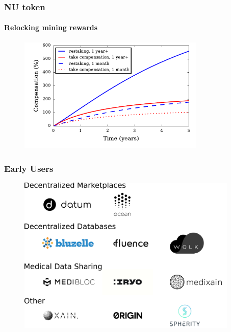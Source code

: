 \documentclass[xetex,mathsans,sans,aspectratio=169]{beamer}
\begin{document}
    \begin{frame}
        \frametitle{NU token}
        \framesubtitle{Relocking mining rewards}
        \begin{figure}
            \centering
            \includegraphics[height=5.5cm]{pdf/total-compensation.pdf}
        \end{figure}
    \end{frame}

    \begin{frame}
      \frametitle{Early Users}
      \begin{figure}
           \includegraphics[width=10.5cm]{pdf/projects.pdf}
      \end{figure}
    \end{frame}
\end{document}
